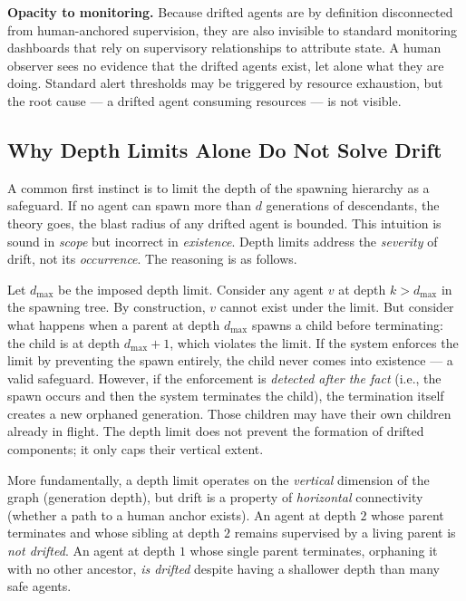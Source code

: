 \textbf{Opacity to monitoring.} Because drifted agents are by definition disconnected from human-anchored supervision, they are also invisible to standard monitoring dashboards that rely on supervisory relationships to attribute state. A human observer sees no evidence that the drifted agents exist, let alone what they are doing. Standard alert thresholds may be triggered by resource exhaustion, but the root cause — a drifted agent consuming resources — is not visible.

\subsection{Why Depth Limits Alone Do Not Solve Drift}

A common first instinct is to limit the depth of the spawning hierarchy as a safeguard. If no agent can spawn more than $d$ generations of descendants, the theory goes, the blast radius of any drifted agent is bounded. This intuition is sound in \emph{scope} but incorrect in \emph{existence}. Depth limits address the \emph{severity} of drift, not its \emph{occurrence}. The reasoning is as follows.

Let $d_{\max}$ be the imposed depth limit. Consider any agent $v$ at depth $k > d_{\max}$ in the spawning tree. By construction, $v$ cannot exist under the limit. But consider what happens when a parent at depth $d_{\max}$ spawns a child before terminating: the child is at depth $d_{\max} + 1$, which violates the limit. If the system enforces the limit by preventing the spawn entirely, the child never comes into existence — a valid safeguard. However, if the enforcement is \emph{detected after the fact} (i.e., the spawn occurs and then the system terminates the child), the termination itself creates a new orphaned generation. Those children may have their own children already in flight. The depth limit does not prevent the formation of drifted components; it only caps their vertical extent.

More fundamentally, a depth limit operates on the \emph{vertical} dimension of the graph (generation depth), but drift is a property of \emph{horizontal} connectivity (whether a path to a human anchor exists). An agent at depth $2$ whose parent terminates and whose sibling at depth $2$ remains supervised by a living parent is \emph{not drifted}. An agent at depth $1$ whose single parent terminates, orphaning it with no other ancestor, \emph{is drifted} despite having a shallower depth than many safe agents.

